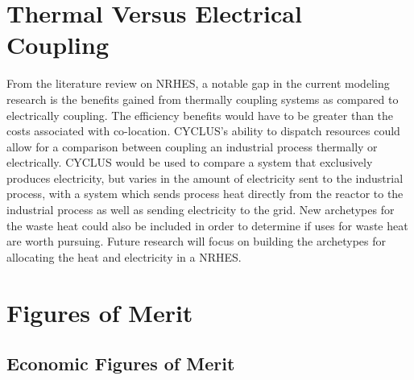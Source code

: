 \documentclass[12pt]{UIdahoMastersThesis}
\begin{document}
\chapter{Thermal Versus Electrical Coupling}
From the literature review on NRHES, a notable gap in the current modeling research is the benefits gained from thermally coupling systems as compared to electrically coupling.  The efficiency benefits would have to be greater than the costs associated with co-location.  CYCLUS's ability to dispatch resources could allow for a comparison between coupling an industrial process thermally or electrically. CYCLUS would be used to compare a system that exclusively produces electricity, but varies in the amount of electricity sent to the industrial process, with a system which sends process heat directly from the reactor to the industrial process as well as sending electricity to the grid.   New archetypes for the waste heat could also be included in order to determine if uses for waste heat are worth pursuing.  Future research will focus on building the archetypes for allocating the heat and electricity in a NRHES. 

\chapter{Figures of Merit}
\section{Economic Figures of Merit}
\end{document}
